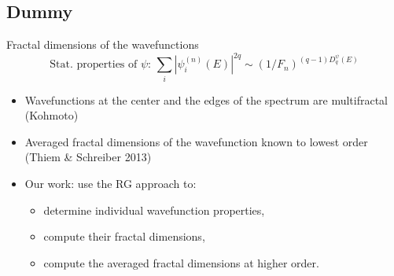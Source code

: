 \documentclass[xcolor=x11names,compress,professionalfonts]{beamer}
\renewcommand{\(}{\begin{columns}}
\renewcommand{\)}{\end{columns}}
\newcommand{\<}[1]{\begin{column}{#1}}
\renewcommand{\>}{\end{column}}
\begin{document}
\subsection{Dummy}
\begin{frame}{Fractal dimensions of the wavefunctions}
	\[
	\text{Stat. properties of $\psi$:~} 
	\sum_i |\psi_i^{(n)}(E)|^{2q} \sim (1/F_n)^{(q-1)D_q^\psi(E)} 
	\]
\begin{itemize}
	\item Wavefunctions at the center and the edges of the spectrum are multifractal (Kohmoto)
	\item Averaged fractal dimensions of the wavefunction known to lowest order  (Thiem \& Schreiber 2013)
	\item Our work: use the RG approach to:
	\begin{itemize}
		\item  determine individual wavefunction properties,
		\item compute their fractal dimensions,
		\item compute the averaged fractal dimensions at higher order.
	\end{itemize}
\end{itemize}
\end{frame}
\end{document}
